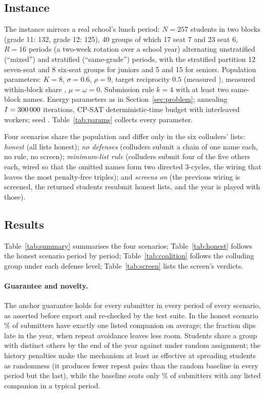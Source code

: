 \documentclass[11pt,a4paper]{article}
\theoremstyle{plain}
\theoremstyle{definition}
\theoremstyle{remark}
\begin{document}
\subsection{Instance}
The instance mirrors a real school's lunch period: $N = 257$ students in two blocks (grade 11: 132, grade 12: 125), 40 groups of which 17 seat 7 and 23 seat 6, $R = 16$ periods (a two-week rotation over a school year) alternating unstratified (``mixed'') and stratified (``same-grade'') periods, with the stratified partition 12 seven-seat and 8 six-seat groups for juniors and 5 and 15 for seniors. Population parameters: $K = 8$, $\sigma = 0.6$, $\rho = 9$, target reciprocity $0.5$ (measured \Reciprocity), measured within-block share \WithinGrade, $\mu = \omega = 0$. Submission rule $k = 4$ with at least two same-block names. Energy parameters as in Section~\ref{sec:problem}; annealing $I = 300\,000$ iterations, CP-SAT deterministic-time budget \CpsatTime{} with \Workers{} interleaved workers; seed \Seed. Table~\ref{tab:params} collects every parameter.

Four scenarios share the population and differ only in the six colluders' lists: \emph{honest} (all lists honest); \emph{no defenses} (colluders submit a chain of one name each, no rule, no screen); \emph{minimum-list rule} (colluders submit four of the five others each, wired so that the omitted names form two directed 3-cycles, the wiring that leaves the most penalty-free triples); and \emph{screens on} (the previous wiring is screened, the returned students resubmit honest lists, and the year is played with those).

\subsection{Results}
Table~\ref{tab:summary} summarises the four scenarios; Table~\ref{tab:honest} follows the honest scenario period by period; Table~\ref{tab:coalition} follows the colluding group under each defense level; Table~\ref{tab:screen} lists the screen's verdicts.


\paragraph{Guarantee and novelty.} The anchor guarantee holds for every submitter in every period of every scenario, as asserted before export and re-checked by the test suite. In the honest scenario \HonestExactlyOne\% of submitters have exactly one listed companion on average; the fraction dips late in the year, when repeat avoidance leaves less room. Students share a group with \HonestMet{} distinct others by the end of the year against \RandomMet{} under random assignment; the history penalties make the mechanism at least as effective at spreading students as randomness (it produces fewer repeat pairs than the random baseline in every period but the last), while the baseline seats only \RandomGeOne\% of submitters with any listed companion in a typical period.
\end{document}
